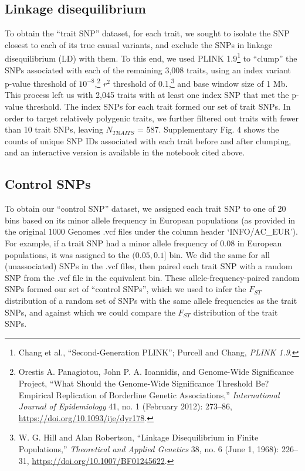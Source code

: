 \documentclass[
  9pt,
]{book}
\begin{document}
\hypertarget{linkage-disequilibrium}{%
\subsection{Linkage disequilibrium}\label{linkage-disequilibrium}}

To obtain the ``trait SNP'' dataset, for each trait, we sought to isolate the SNP closest to each of its true causal variants, and exclude the SNPs in linkage disequilibrium (LD) with them. To this end, we used PLINK 1.9\footnote{Chang et al., {``Second-Generation {PLINK}''}; Purcell and Chang, \emph{{PLINK} 1.9}.} to ``clump'' the SNPs associated with each of the remaining 3,008 traits, using an index variant p-value threshold of \(10^{-8}\),\footnote{Orestis A. Panagiotou, John P. A. Ioannidis, and Genome-Wide Significance Project, {``What Should the Genome-Wide Significance Threshold Be? {Empirical} Replication of Borderline Genetic Associations,''} \emph{International Journal of Epidemiology} 41, no. 1 (February 2012): 273--86, \url{https://doi.org/10.1093/ije/dyr178}.} \(r^2\) threshold of 0.1,\footnote{W. G. Hill and Alan Robertson, {``Linkage Disequilibrium in Finite Populations,''} \emph{Theoretical and Applied Genetics} 38, no. 6 (June 1, 1968): 226--31, \url{https://doi.org/10.1007/BF01245622}.} and base window size of 1 Mb. This process left us with 2,045 traits with at least one index SNP that met the p-value threshold. The index SNPs for each trait formed our set of trait SNPs. In order to target relatively polygenic traits, we further filtered out traits with fewer than 10 trait SNPs, leaving \(N_{TRAITS}\) = 587. Supplementary Fig. 4 shows the counts of unique SNP IDs associated with each trait before and after clumping, and an interactive version is available in the notebook cited above.

\hypertarget{control-snps}{%
\subsection{Control SNPs}\label{control-snps}}

To obtain our ``control SNP'' dataset, we assigned each trait SNP to one of 20 bins based on its minor allele frequency in European populations (as provided in the original 1000 Genomes .vcf files under the column header `INFO/AC\_EUR'). For example, if a trait SNP had a minor allele frequency of 0.08 in European populations, it was assigned to the \((0.05, 0.1]\) bin. We did the same for all (unassociated) SNPs in the .vcf files, then paired each trait SNP with a random SNP from the .vcf file in the equivalent bin. These allele-frequency-paired random SNPs formed our set of ``control SNPs'', which we used to infer the \(F_{ST}\) distribution of a random set of SNPs with the same allele frequencies as the trait SNPs, and against which we could compare the \(F_{ST}\) distribution of the trait SNPs.
\end{document}
